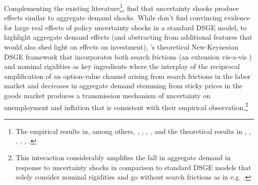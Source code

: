 \documentclass[a4paper,11pt,listof=nochaptergap,oneside,pointednumbers,bibtotoc,bigheadings,liststotoc,hidelinks]{scrbook}
\theoremstyle{mysatz}
\theoremstyle{mydefinition}
\theoremstyle{mytheorem}
\theoremstyle{mybemerkung}
\begin{document}
Complementing the existing literature\footnote{The empirical results in, among others, \citet{bloom:09}, \citet{bloometal:12}, \citet{juradoetal:15}, \citet{scotti:16}, \citet{bachmannetal:13} and the theoretical results in \citet{bloom:09}, \citet{gilchristetal:14}, \citet{arenalloetal:11}, \citet{basuandbundick:17}, \citet{bloometal:12}, \citet{bornandpfeifer:14}.}, \citet{leducandliu:16} find that uncertainty shocks produce effects similar to aggregate demand shocks. While \citet{bornandpfeifer:14} don't find convincing evidence for large real effects of policy uncertainty shocks in a standard DSGE model, to highlight aggregate demand effects (and abstracting from additional features that would also shed light on effects on investment), \citet{leducandliu:16}'s theoretical New-Keynesian DSGE framework that incorporates both search frictions (an extension vis-a-vis \citealp{basuandbundick:17}) and nominal rigidities as key ingredients where the interplay of the reciprocal amplification of an option-value channel arising from search frictions in the labor market and decreases in aggregate demand stemming from sticky prices in the goods market produces a transmission mechanism of uncertainty on unemployment and inflation that is consistent with their empirical observation.\footnote{This interaction considerably amplifies the fall in aggregate demand in response to uncertainty shocks in comparison to standard DSGE models that solely consider nominal rigidities and go without search frictions as in e.g. \citet{basuandbundick:17}.} 
\end{document}
